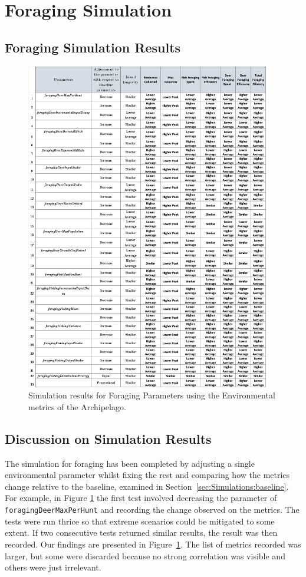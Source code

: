 \section{Foraging Simulation}
\subsection{Foraging Simulation Results}
\begin{figure}[!htb]
    \centering
    \includegraphics[width=0.95\textwidth]{16_results_and_eval/images/ForageCommonSim.png}
    \caption{Simulation results for Foraging Parameters using the Environmental metrics of the Archipelago.}
    \label{fig:Resource}
\end{figure}
\subsection{Discussion on Simulation Results}
The simulation for foraging has been completed by adjusting a single environmental parameter whilst fixing the rest and comparing how the metrics change relative to the baseline, examined in Section~\ref{sec:Simulations:baseline}. For example, in Figure \ref{fig:Resource} the first test involved decreasing the parameter of \texttt{foragingDeerMaxPerHunt} and recording the change observed on the metrics. The tests were run thrice so that extreme scenarios could be mitigated to some extent. If two consecutive tests returned similar results, the result was then recorded. Our findings are presented in Figure~\ref{fig:Resource}. The list of metrics recorded was larger, but some were discarded because no strong correlation was visible and others were just irrelevant. 

